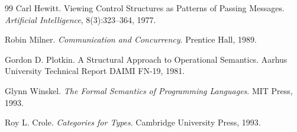\documentclass[12pt,oneside]{article}
\theoremstyle{definition}
\theoremstyle{remark}
\begin{document}
\begin{thebibliography}{99}
Carl Hewitt.
\newblock Viewing Control Structures as Patterns of Passing Messages.
\newblock \emph{Artificial Intelligence}, 8(3):323--364, 1977.

Robin Milner.
\newblock \emph{Communication and Concurrency}.
\newblock Prentice Hall, 1989.

Gordon D. Plotkin.
\newblock A Structural Approach to Operational Semantics.
\newblock Aarhus University Technical Report DAIMI FN-19, 1981.

Glynn Winskel.
\newblock \emph{The Formal Semantics of Programming Languages}.
\newblock MIT Press, 1993.

Roy L. Crole.
\newblock \emph{Categories for Types}.
\newblock Cambridge University Press, 1993.

\end{thebibliography}
\end{document}
